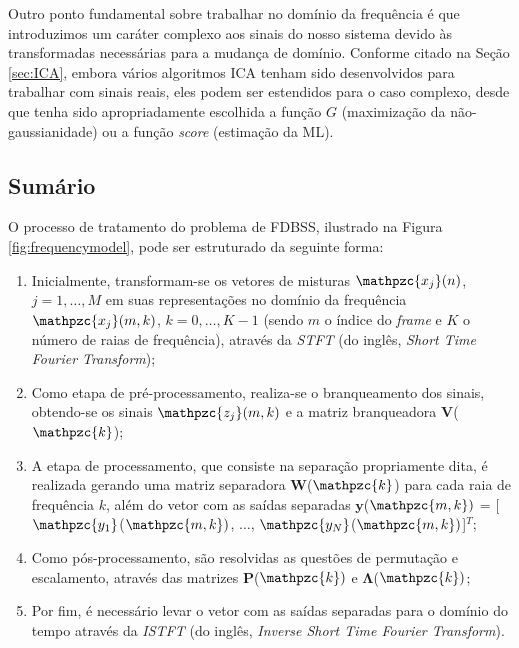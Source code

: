        Outro ponto fundamental sobre trabalhar no domínio da frequência é que introduzimos um caráter complexo aos sinais do nosso sistema devido às transformadas necessárias para a mudança de domínio. Conforme citado na Seção \ref{sec:ICA}, embora vários algoritmos ICA tenham sido desenvolvidos para trabalhar com sinais reais, eles podem ser estendidos para o caso complexo, desde que tenha sido apropriadamente escolhida a função $G$ (maximização da não-gaussianidade) ou a função \textit{score} (estimação da ML). 
        
    \subsection{Sumário}
        O processo de tratamento do problema de FDBSS, ilustrado na Figura \ref{fig:frequencymodel}, pode ser estruturado da seguinte forma:
        
        \begin{enumerate}
            \item Inicialmente, transformam-se os vetores de misturas $\mathpzc{x_j}(n)$, $j = 1,\dots,M$ em suas representações no domínio da frequência $\mathpzc{x_j}(m,k)$, $k = 0, \dots, K-1$ (sendo $m$ o índice do \textit{frame} e $K$ o número de raias de frequência), através da \textit{STFT} (do inglês, \textit{Short Time Fourier Transform});
            
            \item Como etapa de pré-processamento, realiza-se o branqueamento dos sinais, obtendo-se os sinais $\mathpzc{z_j}(m,k)$ e a matriz branqueadora $\mathbf{V}$($\mathpzc{k}$);
            
            \item A etapa de processamento, que consiste na separação propriamente dita, é realizada gerando uma matriz separadora $\mathbf{W}$($\mathpzc{k}$) para cada raia de frequência $k$, além do vetor com as saídas separadas $\mathbf{y}$($\mathpzc{m,k})$ = [$\mathpzc{y_1}$($\mathpzc{m,k})$, $\dots$, $\mathpzc{y_N}$($\mathpzc{m,k})$]$^T$;
            
            \item Como pós-processamento, são resolvidas as questões de permutação e escalamento, através das matrizes $\mathbf{P}$($\mathpzc{k})$ e $\mathbf{\Lambda}$($\mathpzc{k})$;
            
            \item Por fim, é necessário levar o vetor com as saídas separadas para o domínio do tempo através da \textit{ISTFT} (do inglês, \textit{Inverse Short Time Fourier Transform}).
            
        \end{enumerate}

